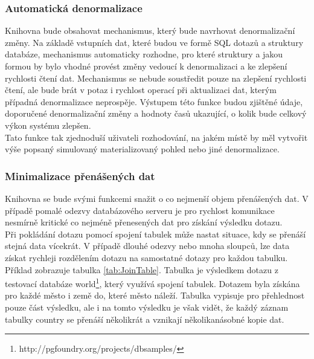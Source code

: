 \documentclass[ing,male,java,dept456]{diploma}						%
\begin{document}
\subsubsection{Automatická denormalizace}

Knihovna bude obsahovat mechanismus, který bude navrhovat denormalizační změny. Na základě vstupních dat, které budou ve formě SQL dotazů a struktury databáze, mechanismus automaticky rozhodne, pro které struktury a jakou formou by bylo vhodné provést změny vedoucí k denormalizaci a ke zlepšení rychlosti čtení dat. Mechanismus se nebude soustředit pouze na zlepšení rychlosti čtení, ale bude brát v potaz i rychlost operací při aktualizaci dat, kterým případná denormalizace neprospěje. Výstupem této funkce budou zjištěné údaje, doporučené denormalizační změny a hodnoty časů ukazující, o kolik bude celkový výkon systému zlepšen. \\
Tato funkce tak zjednoduší uživateli rozhodování, na jakém místě by měl vytvořit výše popsaný simulovaný materializovaný pohled nebo jiné denormalizace.

\subsubsection{Minimalizace přenášených dat}
\label{subsubsec:Selectin}

Knihovna se bude svými funkcemi snažit o co nejmenší objem přenášených dat. V případě pomalé odezvy databázového serveru je pro rychlost komunikace nesmírně kritické co nejméně přenesených dat pro získání výsledku dotazu. \\
Při pokládání dotazu pomocí spojení tabulek může nastat situace, kdy se přenáší stejná data vícekrát. V případě dlouhé odezvy nebo mnoha sloupců, lze data získat rychleji rozdělením dotazu na samostatné dotazy pro každou tabulku. Příklad zobrazuje tabulka \ref{tab:JoinTable}. Tabulka je výsledkem dotazu z testovací databáze world\footnote{http://pgfoundry.org/projects/dbsamples/}, který využívá spojení tabulek. Dotazem byla získána pro každé město i země do, které město náleží. Tabulka vypisuje pro přehlednost pouze část výsledku, ale i na tomto výsledku je však vidět, že každý záznam tabulky country se přenáší několikrát a vznikají několikanásobné kopie dat. \\
\end{document}
